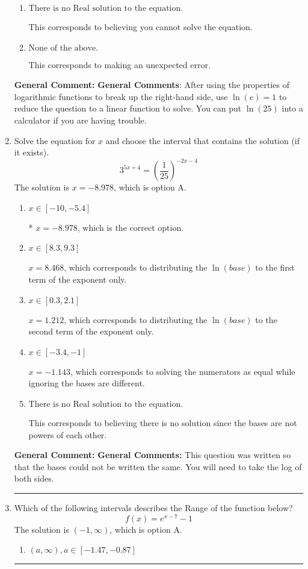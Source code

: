 \documentclass{extbook}[14pt]
\newcommand{\litem}[1]{\item #1

\rule{\textwidth}{0.4pt}}
\begin{document}
\begin{enumerate}
{\begin{enumerate}[label=\Alph*.]
$x = -0.686$, which corresponds to treating any root as a square root.
\item \( \text{There is no Real solution to the equation.} \)

This corresponds to believing you cannot solve the equation.
\item \( \text{None of the above.} \)

This corresponds to making an unexpected error.
\end{enumerate}

\textbf{General Comment:} \textbf{General Comments}: After using the properties of logarithmic functions to break up the right-hand side, use $\ln(e) = 1$ to reduce the question to a linear function to solve. You can put $\ln(25)$ into a calculator if you are having trouble.
}
\litem{
Solve the equation for $x$ and choose the interval that contains the solution (if it exists).
\[ 3^{5x+4} = \left(\frac{1}{25}\right)^{-2x-4} \]The solution is \( x = -8.978 \), which is option A.\begin{enumerate}[label=\Alph*.]
\item \( x \in [-10, -5.4] \)

* $x = -8.978$, which is the correct option.
\item \( x \in [8.3, 9.3] \)

$x = 8.468$, which corresponds to distributing the $\ln(base)$ to the first term of the exponent only.
\item \( x \in [0.3, 2.1] \)

$x = 1.212$, which corresponds to distributing the $\ln(base)$ to the second term of the exponent only.
\item \( x \in [-3.4, -1] \)

$x = -1.143$, which corresponds to solving the numerators as equal while ignoring the bases are different.
\item \( \text{There is no Real solution to the equation.} \)

This corresponds to believing there is no solution since the bases are not powers of each other.
\end{enumerate}

\textbf{General Comment:} \textbf{General Comments:} This question was written so that the bases could not be written the same. You will need to take the log of both sides.
}
\litem{
Which of the following intervals describes the Range of the function below?
\[ f(x) = e^{x-7}-1 \]The solution is \( (-1, \infty) \), which is option A.\begin{enumerate}[label=\Alph*.]
\item \( (a, \infty), a \in [-1.47, -0.87] \)


\end{enumerate}}
\end{enumerate}
\end{document}
